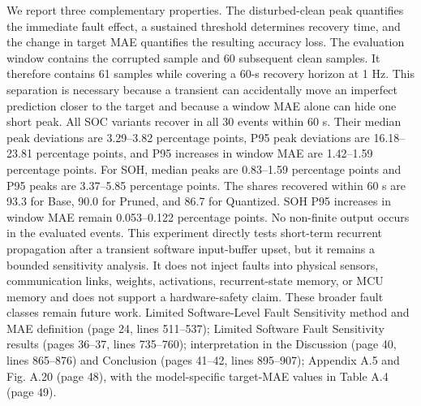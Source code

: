 {}We report three complementary properties. The disturbed-clean peak quantifies the immediate fault effect, a sustained threshold determines recovery time, and the change in target MAE quantifies the resulting accuracy loss. The evaluation window contains the corrupted sample and 60 subsequent clean samples. It therefore contains 61 samples while covering a 60-s recovery horizon at 1 Hz. This separation is necessary because a transient can accidentally move an imperfect prediction closer to the target and because a window MAE alone can hide one short peak. All SOC variants recover in all 30 events within 60 s. Their median peak deviations are 3.29--3.82 percentage points, P95 peak deviations are 16.18--23.81 percentage points, and P95 increases in window MAE are 1.42--1.59 percentage points. For SOH, median peaks are 0.83--1.59 percentage points and P95 peaks are 3.37--5.85 percentage points. The shares recovered within 60 s are 93.3\markdownRendererPercentSign{} for Base, 90.0\markdownRendererPercentSign{} for Pruned, and 86.7\markdownRendererPercentSign{} for Quantized. SOH P95 increases in window MAE remain 0.053--0.122 percentage points. No non-finite output occurs in the evaluated events.\markdownRendererParagraphSeparator
{}This experiment directly tests short-term recurrent propagation after a transient software input-buffer upset, but it remains a bounded sensitivity analysis. It does not inject faults into physical sensors, communication links, weights, activations, recurrent-state memory, or MCU memory and does not support a hardware-safety claim. These broader fault classes remain future work.\markdownRendererParagraphSeparator
{} Limited Software-Level Fault Sensitivity method and MAE definition (page 24, lines 511--537); Limited Software Fault Sensitivity results (pages 36--37, lines 735--760); interpretation in the Discussion (page 40, lines 865--876) and Conclusion (pages 41--42, lines 895--907); Appendix A.5 and Fig. A.20 (page 48), with the model-specific target-MAE values in Table A.4 (page 49).
\markdownRendererSectionEnd 
\markdownRendererSectionEnd \markdownRendererDocumentEnd